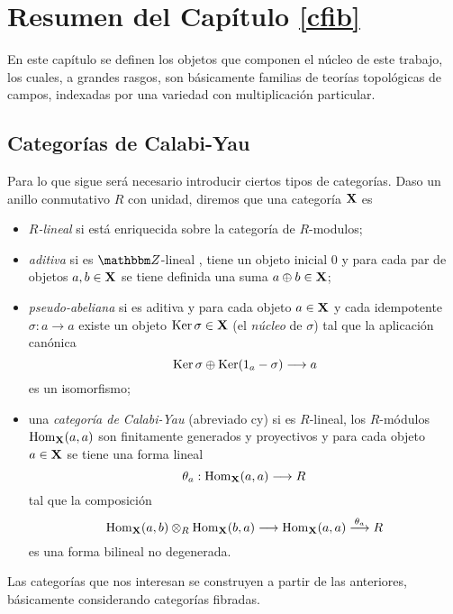 {\small
\section{Resumen del Cap\'itulo \ref{cfib}}

En este cap\'itulo se definen los objetos que componen el n\'ucleo de este trabajo, los cuales, a grandes rasgos, son b\'asicamente familias de teor\'ias topol\'ogicas de campos, indexadas por una variedad con multiplicaci\'on particular.


\subsection{Categor\'ias de Calabi-Yau}

Para lo que sigue ser\'a necesario introducir ciertos tipos de categor\'ias. Daso un anillo conmutativo $R$ con unidad, diremos que una categor\'ia ${\bf X}$ es
\begin{itemize}
\item \emph{$R$-lineal} si est\'a enriquecida sobre la categor\'ia de $R$-modulos;
\item \emph{aditiva} si es $\ent$-lineal , tiene un objeto inicial $0$ y para cada par de objetos $a,b\in {\bf X}$ se tiene definida una suma $a\oplus b\in {\bf X}$;
\item \emph{pseudo-abeliana} si es aditiva y para cada objeto $a\in {\bf X}$ y cada idempotente $\sigma :a\to a$ existe un objeto $\operatorname{Ker}\sigma \in {\bf X}$ (el \emph{n\'ucleo} de $\sigma$) tal que la aplicaci\'on can\'onica
$$ \operatorname{Ker} \sigma \oplus \operatorname{Ker} (1_a -\sigma )\longrightarrow a$$
es un isomorfismo;
\item una \emph{categor\'ia de Calabi-Yau} (abreviado {\sc cy}) si es $R$-lineal, los $R$-m\'odulos $\operatorname{Hom}_{\bf X}(a,a)$ son finitamente generados y proyectivos y para cada objeto $a\in {\bf X}$ se tiene una forma lineal
$$\theta_a:\operatorname{Hom}_{\bf X}(a,a)\longrightarrow R$$
tal que la composici\'on
$$ \operatorname{Hom}_{{\bf X}}(a,b)\otimes_R
  \operatorname{Hom}_{{\bf X}}(b,a)\longrightarrow 
  \operatorname{Hom}_{{\bf X}}(a,a)\stackrel{\theta_a}{\longrightarrow }R$$
es una forma bilineal no degenerada.
\end{itemize}

Las categor\'ias que nos interesan se construyen a partir de las anteriores, b\'asicamente considerando categor\'ias fibradas.

}
